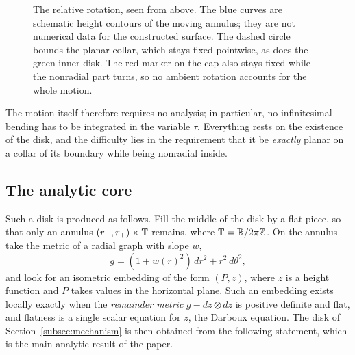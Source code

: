 \begin{figure}[htbp]
\centering
{}
\caption{The relative rotation, seen from above. The blue curves are
schematic height contours of the moving annulus; they are not numerical
data for the constructed surface. The dashed circle bounds the planar
collar, which stays fixed pointwise, as does the green inner disk. The
red marker on the cap also stays fixed while the nonradial part turns,
so no ambient rotation accounts for the whole motion.}
\label{fig:surface-motion}
\end{figure}

The motion itself therefore requires no analysis; in particular, no
infinitesimal bending has to be integrated in the variable $\tau$.
Everything rests on the existence of the disk, and the difficulty lies
in the requirement that it be \emph{exactly} planar on a collar of its
boundary while being nonradial inside.

\subsection{The analytic core}

Such a disk is produced as follows. Fill the middle of the disk by a
flat piece, so that only an annulus $(r_-,r_+)\times\mathbb T$ remains, where
$\mathbb T=\mathbb R/2\pi\mathbb Z$. On the annulus take the metric of a radial graph with
slope $w$,
\begin{equation}\label{eq:intro-metric-form}
 g=(1+w(r)^2)\,dr^2+r^2\,d\theta^2,
\end{equation}
and look for an isometric embedding of the form $(P,z)$, where $z$ is
a height function and $P$ takes values in the horizontal plane. Such
an embedding exists locally exactly when the \emph{remainder metric}
$g-dz\otimes dz$ is positive definite and flat, and flatness is a
single scalar equation for $z$, the Darboux equation. The disk of
Section~\ref{subsec:mechanism} is then obtained from the following
statement, which is the main analytic result of the paper.

